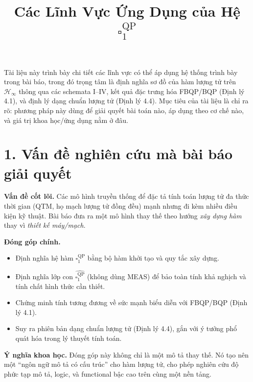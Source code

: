 \documentclass[12pt,a4paper]{article}
\title{Các Lĩnh Vực Ứng Dụng của Hệ \(\square_{1}^{\mathrm{QP}}\)}
\author{}
\date{}
\begin{document}
\maketitle
\fontsize{12pt}{18pt}\selectfont

Tài liệu này trình bày chi tiết các lĩnh vực có thể áp dụng hệ thống trình bày trong bài báo, trong đó trọng tâm là định nghĩa sơ đồ của hàm lượng tử trên $\mathcal{H}_{\infty}$ thông qua các schemata I--IV, kết quả đặc trưng hóa FBQP/BQP (Định lý 4.1), và định lý dạng chuẩn lượng tử (Định lý 4.4). Mục tiêu của tài liệu là chỉ ra rõ: phương pháp này dùng để giải quyết bài toán nào, áp dụng theo cơ chế nào, và giá trị khoa học/ứng dụng nằm ở đâu.

\section*{1. Vấn đề nghiên cứu mà bài báo giải quyết}
\textbf{Vấn đề cốt lõi.} Các mô hình truyền thống để đặc tả tính toán lượng tử đa thức thời gian (QTM, họ mạch lượng tử đồng đều) mạnh nhưng đi kèm nhiều điều kiện kỹ thuật. Bài báo đưa ra một mô hình thay thế theo hướng \textit{xây dựng hàm} thay vì \textit{thiết kế máy/mạch}.

\textbf{Đóng góp chính.}
\begin{itemize}[leftmargin=1.5em]
\item Định nghĩa hệ hàm $\square_{1}^{\mathrm{QP}}$ bằng bộ hàm khởi tạo và quy tắc xây dựng.
\item Định nghĩa lớp con $\widehat{\square_{1}^{\mathrm{QP}}}$ (không dùng MEAS) để bảo toàn tính khả nghịch và tính chất hình thức cần thiết.
\item Chứng minh tính tương đương về sức mạnh biểu diễn với FBQP/BQP (Định lý 4.1).
\item Suy ra phiên bản dạng chuẩn lượng tử (Định lý 4.4), gắn với ý tưởng phổ quát hóa trong lý thuyết tính toán.
\end{itemize}

\textbf{Ý nghĩa khoa học.} Đóng góp này không chỉ là một mô tả thay thế. Nó tạo nên một ``ngôn ngữ mô tả có cấu trúc'' cho hàm lượng tử, cho phép nghiên cứu độ phức tạp mô tả, logic, và functional bậc cao trên cùng một nền tảng.
\end{document}
